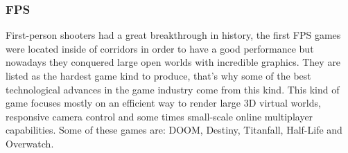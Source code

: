 \subsubsection{FPS}
First-person shooters had a great breakthrough in history, the first FPS games were located inside of corridors in order to have a good performance but nowadays they conquered large open worlds with incredible graphics. They are listed as the hardest game kind to produce, that's why some of the best technological advances in the game industry come from this kind. This kind of game focuses mostly on an efficient way to render large 3D virtual worlds, responsive camera control and some times small-scale online multiplayer capabilities\cite{GameEngineArchitecture}. Some of these games are: DOOM, Destiny, Titanfall, Half-Life and Overwatch\cite{FPSGames}.
